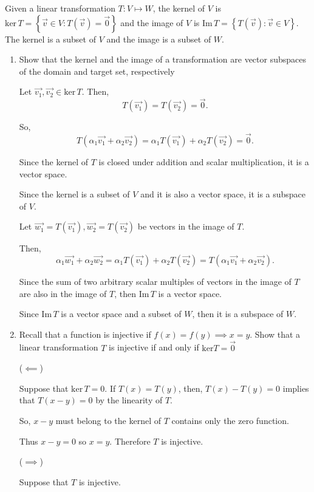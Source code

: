 \documentclass{article}
\begin{document}
  Given a linear transformation $T:V \longmapsto W$, the kernel of $V$ is $\text{ker}\,T=\left\{ \vec{v} \in V : T(\vec{v})=\vec{0} \right\} $ and the image of $V$ is $\text{Im}\,T=\left\{ T(\vec{v}):\vec{v}\in V \right\} $. The kernel is a subset of $V$ and the image is a subset of $W$.
  \begin{enumerate}[label= (\alph*)]
  \item Show that the kernel and the image of a transformation are vector subspaces of the domain and target set, respectively

    Let $\vec{v_1},\vec{v_2} \in \text{ker}\,T$. Then,
    \[
      T(\vec{v_1})=T(\vec{v_2})=\vec{0}. 
    \]
     

    So,
    \[
      T(\alpha_1\vec{v_1}+\alpha_2\vec{v_2})=\alpha_1T(\vec{v_1})+\alpha_2T(\vec{v_2})=\vec{0}. 
    \]

    Since the kernel of $T $ is closed under addition and scalar multiplication, it is a vector space. 

    Since the kernel is a subset of $V $ and it is also a vector space, it is a subspace of $V $.


    Let $\vec{w_1}=T(\vec{v_1}),\vec{w_2}=T(\vec{v_2})$ be vectors in the image of $T$.

    Then, \[
    \alpha_1\vec{w_1}+\alpha_2\vec{w_2} = \alpha_1T(\vec{v_1})+\alpha_2T(\vec{v_2}) = T(\alpha_1\vec{v_1}+\alpha_2\vec{v_2})
    .\] 

    Since the sum of two arbitrary scalar multiples of vectors in the image of $T $ are also in the image of $T $, then $\text{Im}\, T$ is a vector space. 

    Since $\text{Im}\,T$ is a vector space and a subset of $W $, then it is a subspace of $W$. 


  \item Recall that a function is injective if $f(x)=f(y)\implies x=y$. Show that a linear transformation $T$ is injective if and only if $\text{ker}T={\vec{0}}$

  ($\impliedby$)
  
  Suppose that $\text{ker}\,T={0}$. If $T(x)=T(y)$, then, $T(x)-T(y)=0$ implies that $T(x-y)=0$ by the linearity of $T$. 

  So, $x-y$ must belong to the kernel of $T$ contains only the zero function. 

  Thus $x-y=0$ so $x=y$. Therefore $T$ is injective. 

  ($\implies$) 

  Suppose that $T $ is injective. 


\end{enumerate}
\end{document}
